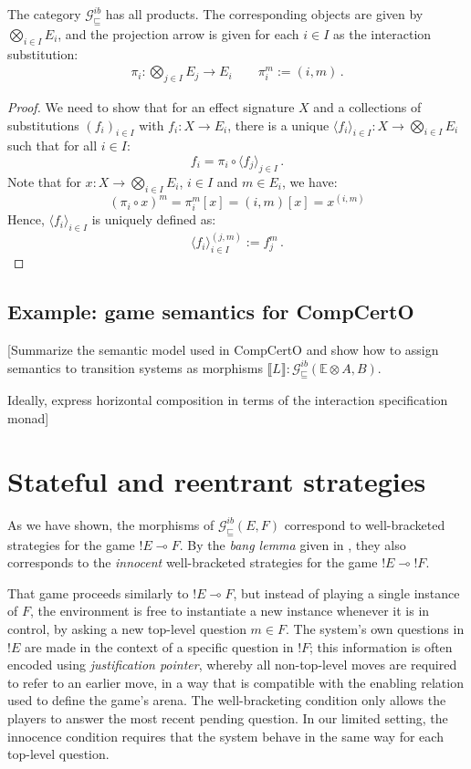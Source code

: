 \documentclass[format=sigplan,authordraft]{acmart}
\newcommand{\gcat}{\mathcal{G}_{\sqsubseteq}}
\begin{document}
\begin{lemma}
The category $\gcat^{ib}$ has all products.
The corresponding objects are given by $\bigotimes_{i \in I} E_i$,
and the projection arrow
is given for each $i \in I$ as
the interaction substitution:
\begin{gather*}
    \pi_i : \bigotimes_{j \in I} E_j \rightarrow E_i \qquad
    \pi_i^m := (i, m) \,.
\end{gather*}
\begin{proof}
We need to show that for an effect signature $X$
and a collections of substitutions $(f_i)_{i \in I}$ with
$f_i : X \rightarrow E_i$,
there is a unique
$\langle f_i \rangle_{i \in I} : X \rightarrow \bigotimes_{i \in I} E_i$
such that for all $i \in I$:
\[
    f_i = \pi_i \circ \langle f_j \rangle_{j \in I} \,.
\]
Note that for $x : X \rightarrow \bigotimes_{i \in I} E_i$,
$i \in I$ and $m \in E_i$, we have:
\[
    (\pi_i \circ x)^m = \pi_i^m[x] = (i, m) [x] = x^{(i, m)}
\]
Hence, $\langle f_i \rangle_{i \in I}$ is uniquely defined as:
\[
    \langle f_i \rangle_{i \in I}^{(j, m)} := f_j^m \,.
\]
\end{proof}
\end{lemma}


\subsection{Example: game semantics for CompCertO}

[Summarize the semantic model used in CompCertO
and show how to assign semantics to transition systems
as morphisms
$\llbracket L \rrbracket : \gcat^{ib}(\mathbb{E} \otimes A, B)$.

Ideally, express horizontal composition
in terms of the interaction specification monad]


\section{Stateful and reentrant strategies} %

As we have shown,
the morphisms of $\gcat^{ib}(E, F)$
correspond to well-bracketed strategies
for the game ${!E} \multimap F$.
By the \emph{bang lemma} given in \cite{gamesem99},
they also corresponds to the
\emph{innocent} well-bracketed strategies
for the game ${!E} \multimap {!F}$.

That game proceeds similarly to ${!E} \multimap F$,
but instead of playing a single instance of $F$,
the environment is free to instantiate a new instance
whenever it is in control,
by asking a new top-level question $m \in F$.
The system's own questions in ${!E}$
are made in the context of a specific question in ${!F}$;
this information is often encoded using \emph{justification pointer},
whereby all non-top-level moves are required to refer to
an earlier move,
in a way that is compatible with the enabling relation
used to define the game's arena.
The well-bracketing condition only allows the players
to answer the most recent pending question.
In our limited setting,
the innocence condition requires that the system
behave in the same way for each top-level question.
\end{document}
